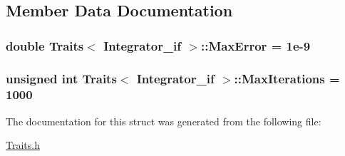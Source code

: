 \subsection{Member Data Documentation}
\subsubsection[{\texorpdfstring{Max\+Error}{MaxError}}]{\setlength{\rightskip}{0pt plus 5cm}double {\bf Traits}$<$ {\bf Integrator\+\_\+if} $>$\+::Max\+Error = 1e-\/9}\hypertarget{struct_traits_3_01_integrator__if_01_4_a32e086683b5e71dd7be4225d717d22a2}{}\label{struct_traits_3_01_integrator__if_01_4_a32e086683b5e71dd7be4225d717d22a2}
\subsubsection[{\texorpdfstring{Max\+Iterations}{MaxIterations}}]{\setlength{\rightskip}{0pt plus 5cm}unsigned int {\bf Traits}$<$ {\bf Integrator\+\_\+if} $>$\+::Max\+Iterations = 1000}\hypertarget{struct_traits_3_01_integrator__if_01_4_a00ccc8b3ca58fdd91a0b40c59a02879b}{}\label{struct_traits_3_01_integrator__if_01_4_a00ccc8b3ca58fdd91a0b40c59a02879b}


The documentation for this struct was generated from the following file\+:\begin{DoxyCompactItemize}
\item 
\hyperlink{_traits_8h}{Traits.\+h}\end{DoxyCompactItemize}
